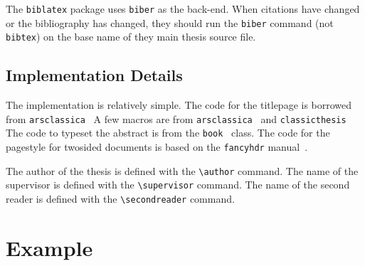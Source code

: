 \documentclass[MScCS]{uccthesis}
\newcommand*{\COMMAND}[1]{\texttt{\textbackslash #1}}
\begin{document}
      The \texttt{biblatex} package uses \texttt{biber} as the back-end.
      When citations have changed or the bibliography has changed,
       they should run the \texttt{biber} command (not \texttt{bibtex})
       on the base name of they main thesis source file.

   \section{Implementation Details}

      The implementation is relatively simple.
      The code for the titlepage is borrowed
       from \texttt{arsclassica}~\Parencite{arsclassica}
      A few macros are from
       \texttt{arsclassica}~\Parencite{arsclassica} and
       \texttt{classicthesis}~\Parencite{classicthesis}
      The code to typeset the abstract is from
       the \texttt{book}~\Parencite{Lamport:94} class.
      The code for the pagestyle for twosided documents
       is based on the \texttt{fancyhdr} manual~\Parencite{fancyhdr}.

      The author of the thesis is defined with
       the \COMMAND{author} command.
      The name of the supervisor is defined with
       the \COMMAND{supervisor} command.
      The name of the second reader is defined with
       the \COMMAND{secondreader} command.

   \chapter{Example}
\end{document}
